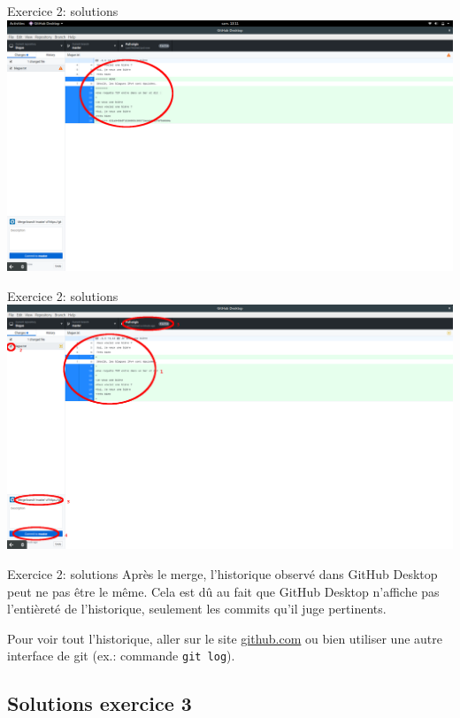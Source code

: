 \documentclass{beamer}
\begin{document}
\begin{frame}{Exercice 2: solutions}
    \centering
    \includegraphics[width=\textwidth]{img/image_exercices/conflic_to_resolve.png}
\end{frame}

\begin{frame}{Exercice 2: solutions}
	\centering
    \includegraphics[width=\textwidth]{img/image_exercices/conflic_resolv.png}
\end{frame}

\begin{frame}{Exercice 2: solutions}
    Après le merge, l'historique observé dans GitHub Desktop peut ne pas être
    le même.
    Cela est dû au fait que GitHub Desktop n'affiche pas l'entièreté de
    l'historique, seulement les commits qu'il juge pertinents.

    Pour voir tout l'historique, aller sur le site \url{github.com} ou bien
    utiliser une autre interface de git (ex.: commande \texttt{git log}).
\end{frame}

\subsection{Solutions exercice 3}
\end{document}
